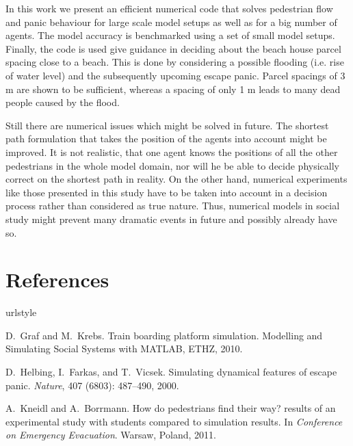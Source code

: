 \documentclass[11pt]{article}
\begin{document}
In this work we present an efficient numerical code that solves pedestrian flow and panic behaviour for large scale model setups as well as for a big number of agents. The model accuracy is benchmarked using a set of small model setups. Finally, the code is used give guidance in deciding about the beach house parcel spacing close to a beach. This is done by considering a possible flooding (i.e. rise of water level) and the subsequently upcoming escape panic. Parcel spacings of 3 m are shown to be sufficient, whereas a spacing of only 1 m leads to many dead people caused by the flood.

Still there are numerical issues which might be solved in future. The shortest path formulation that takes the position of the agents into account might be improved. It is not realistic, that one agent knows the positions of all the other pedestrians in the whole model domain, nor will he be able to decide physically correct on the shortest path in reality. On the other hand, numerical experiments like those presented in this study have to be taken into account in a decision process rather than considered as true nature. Thus, numerical models in social study might prevent many dramatic events in future and possibly already have so.

\section{References}



%


\begin{thebibliography}{3}
\providecommand{\natexlab}[1]{#1}
\providecommand{\url}[1]{\texttt{#1}}
\expandafter\ifx\csname urlstyle\endcsname\relax
  \providecommand{\doi}[1]{doi: #1}\else
  \providecommand{\doi}{doi: \begingroup \urlstyle{rm}\Url}\fi

D.~Graf and M.~Krebs.
\newblock Train boarding platform simulation.
\newblock Modelling and Simulating Social Systems with MATLAB, ETHZ, 2010.

D.~Helbing, I.~Farkas, and T.~Vicsek.
\newblock Simulating dynamical features of escape panic.
\newblock \emph{Nature}, 407 (6803): 487--490, 2000.

A.~Kneidl and A.~Borrmann.
\newblock How do pedestrians find their way? results of an experimental study
  with students compared to simulation results.
\newblock In \emph{Conference on Emergency Evacuation}. Warsaw, Poland, 2011.

\end{thebibliography}
\end{document}
